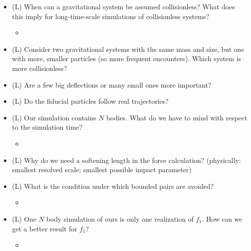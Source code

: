 \begin{itemize}
\begin{itemize}
    \end{itemize}
    \answerboxS
    \item (L) When can a gravitational system be assumed collisionless? What does this imply for long-time-scale simulations of collisionless systems?
    \begin{itemize}
        \item {}
    \end{itemize}
    \answerboxM
    \item (L) Consider two gravitational systems with the same mass and size, but one with more, smaller particles (so more frequent encounters).
    Which system is more collisionless?
    \answerboxM
    \item (L) Are a few big deflections or many small ones more important?
    \answerboxS
    \item (L) Do the fiducial particles follow real trajectories?
    \answerboxS
    \item (L) Our simulation contains $N$ bodies. What do we have to mind with respect to the simulation time?
    \begin{itemize}
        \item {}
    \end{itemize}
    \answerboxS
    \item (L) Why do we need a softening length in the force calculation? (physically: smallest resolved scale; smallest possible impact parameter)
    \answerboxM
    \item (L) What is the condition under which bounded pairs are avoided?
    \begin{itemize}
        \item {}
    \end{itemize}
    \answerboxS
    \item (L) One $N$ body simulation of ours is only one realization of $f_1$. How can we get
    a better result for $f_1$?
    \begin{itemize}
        \item {}
    \end{itemize}
    \answerboxS
\end{itemize}

